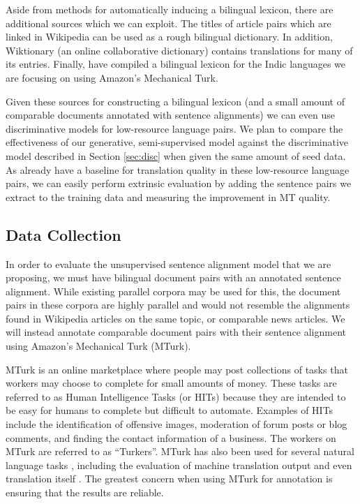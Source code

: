 \documentclass[11pt,letterpaper]{article}
\begin{document}
Aside from methods for automatically inducing a bilingual lexicon, there are
additional sources which we can exploit. The titles of article pairs which are
linked in Wikipedia can be used as a rough bilingual dictionary. In addition,
Wiktionary (an online collaborative dictionary) contains translations for many
of its entries. Finally,  have compiled a bilingual lexicon for
the Indic languages we are focusing on using Amazon's Mechanical Turk.

Given these sources for constructing a bilingual lexicon (and a small amount of
comparable documents annotated with sentence alignments) we can even use
discriminative models for low-resource language pairs. We plan to compare the
effectiveness of our generative, semi-supervised model against the
discriminative model described in Section \ref{sec:disc} when given the same
amount of seed data. As  already have a baseline for translation
quality in these low-resource language pairs, we can easily perform extrinsic
evaluation by adding the sentence pairs we extract to the training data and
measuring the improvement in MT quality.

\subsection{Data Collection}
\label{sec:data}
In order to evaluate the unsupervised sentence alignment model that we are
proposing, we must have bilingual document pairs with an annotated sentence
alignment. While existing parallel corpora may be used for this, the document
pairs in these corpora are highly parallel and would not resemble the alignments
found in Wikipedia articles on the same topic, or comparable news articles. We
will instead annotate comparable document pairs with their sentence alignment
using Amazon's Mechanical Turk (MTurk). 

MTurk is an online marketplace where people may post collections of tasks
that workers may choose to complete for small amounts of money. These tasks are
referred to as Human Intelligence Tasks (or HITs) because they are intended to
be easy for humans to complete but difficult to automate. Examples of HITs
include the identification of offensive images, moderation of forum posts or
blog comments, and finding the contact information of a business. The workers on
MTurk are referred to as ``Turkers''.
MTurk has also been used for several natural language tasks \cite{Snow08},
including the evaluation of machine translation output \cite{Callison-Burch09}
and even translation itself \cite{Zaidan11}. The greatest concern when using
MTurk for annotation is ensuring that the results are reliable.
\end{document}
